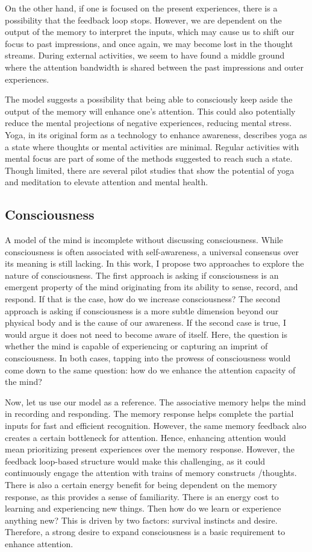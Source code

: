 \documentclass[reprint,amsmath,amssymb,apr,aip,onecolumn, 11pt]{revtex4-1}
\begin{document}
On the other hand, if one is focused on the present experiences, there is a possibility that the feedback loop stops.  However, we are dependent on the output of the memory to interpret the inputs, which may cause us to shift our focus to past impressions, and once again, we may become lost in the thought streams. During external activities, we seem to have found a middle ground where the attention bandwidth is shared between the past impressions and outer experiences. 

The model suggests a possibility that being able to consciously keep aside the output of the memory will enhance one's attention. This could also potentially reduce the mental projections of negative experiences, reducing mental stress. Yoga, in its original form as a technology to enhance awareness, describes yoga as a state where thoughts or mental activities are minimal. Regular activities with mental focus are part of some of the methods suggested to reach such a state\cite{Vivekananda_1896}. Though limited, there are several pilot studies that show the potential of yoga and meditation to elevate attention and mental health\cite{Lazar_2005, Tang_2007, Sadhasivam_2021, Banks_2025}.


\subsection{Consciousness}
A model of the mind is incomplete without discussing consciousness. While consciousness is often associated with self-awareness, a universal consensus over its meaning is still lacking. In this work, I propose two approaches to explore the nature of consciousness.  The first approach is asking if consciousness is an emergent property of the mind originating from its ability to sense, record, and respond. If that is the case, how do we increase consciousness? The second approach is asking if consciousness is a more subtle dimension beyond our physical body and is the cause of our awareness. If the second case is true, I would argue it does not need to become aware of itself. Here, the question is whether the mind is capable of experiencing or capturing an imprint of consciousness. In both cases, tapping into the prowess of consciousness would come down to the same question: how do we enhance the attention capacity of the mind? 

Now, let us use our model as a reference. The associative memory helps the mind in recording and responding. The memory response helps complete the partial inputs for fast and efficient recognition. However, the same memory feedback also creates a certain bottleneck for attention. Hence, enhancing attention would mean prioritizing present experiences over the memory response. However, the feedback loop-based structure would make this challenging, as it could continuously engage the attention with trains of memory constructs /thoughts. There is also a certain energy benefit for being dependent on the memory response, as this provides a sense of familiarity. There is an energy cost to learning and experiencing new things. Then how do we learn or experience anything new? This is driven by two factors: survival instincts and desire. Therefore, a strong desire to expand consciousness is a basic requirement to enhance attention.
\end{document}
